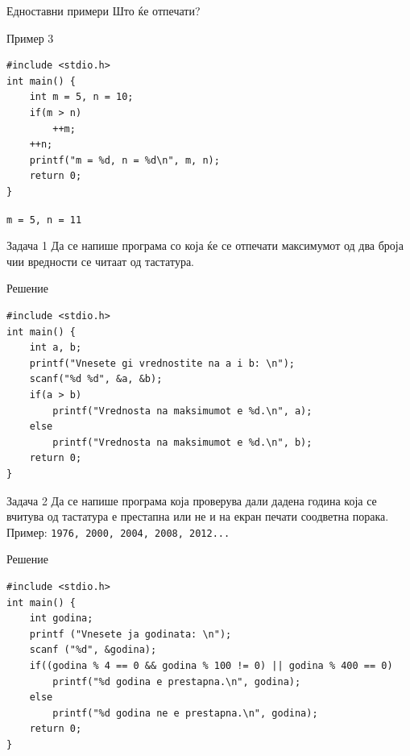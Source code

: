 \begin{frame}[fragile]{Едноставни примери}
Што ќе отпечати?
\begin{exampleblock}{Пример 3}
    \begin{lstlisting}
#include <stdio.h>
int main() {
    int m = 5, n = 10;
    if(m > n)
        ++m;
    ++n;
    printf("m = %d, n = %d\n", m, n);
    return 0;
} 
\end{lstlisting}
\end{exampleblock}
\pause
\vfill
\texttt{m = 5, n = 11}
\end{frame}


\begin{frame}[fragile]{Задача 1}
Да се напише програма со која ќе се отпечати максимумот од два броја чии вредности се читаат од тастатура.
\pause 
    \begin{exampleblock}{Решение}
\begin{lstlisting}
#include <stdio.h>
int main() {
    int a, b;
    printf("Vnesete gi vrednostite na a i b: \n"); 
    scanf("%d %d", &a, &b);
    if(a > b)
        printf("Vrednosta na maksimumot e %d.\n", a); 
    else 
        printf("Vrednosta na maksimumot e %d.\n", b); 
    return 0; 
}
\end{lstlisting}
    \end{exampleblock}

\end{frame}

\begin{frame}[fragile]{Задача 2}
Да се напише програма која проверува дали дадена година која се вчитува од тастатура е престапна или не и на екран печати соодветна порака.\\
Пример: \texttt{1976, 2000, 2004, 2008, 2012...}
\pause
    \begin{exampleblock}{Решение}
        \begin{lstlisting}
#include <stdio.h>
int main() { 
    int godina;
    printf ("Vnesete ja godinata: \n"); 
    scanf ("%d", &godina); 
    if((godina % 4 == 0 && godina % 100 != 0) || godina % 400 == 0) 
        printf("%d godina e prestapna.\n", godina); 
    else 
        printf("%d godina ne e prestapna.\n", godina); 
    return 0; 
}
        \end{lstlisting}
    \end{exampleblock}
\end{frame}



